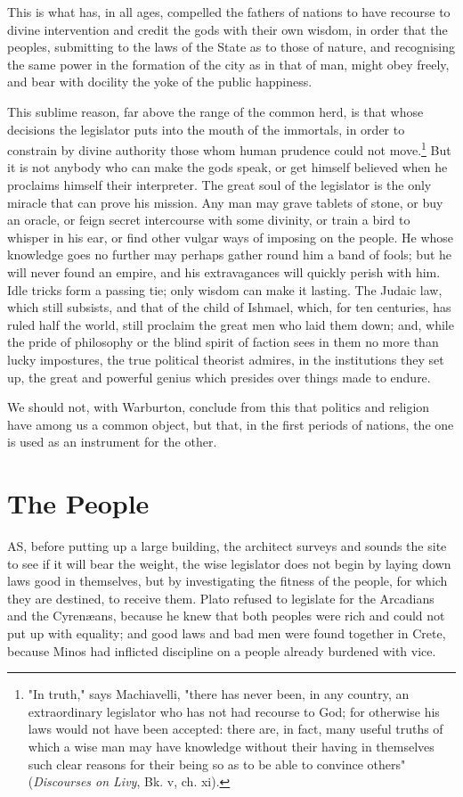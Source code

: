 \documentclass[12pt]{book}
\begin{document}
This is what has, in all ages, compelled the fathers of nations to have recourse to divine intervention and credit the gods with their own wisdom, in order that the peoples, submitting to the laws of the State as to those of nature, and recognising the same power in the formation of the city as in that of man, might obey freely, and bear with docility the yoke of the public happiness.

This sublime reason, far above the range of the common herd, is that whose decisions the legislator puts into the mouth of the immortals, in order to constrain by divine authority those whom human prudence could not move.\footnote{"In truth," says Machiavelli, "there has never been, in any country, an extraordinary legislator who has not had recourse to God; for otherwise his laws would not have been accepted: there are, in fact, many useful truths of which a wise man may have knowledge without their having in themselves such clear reasons for their being so as to be able to convince others" (\textit{Discourses on Livy}, Bk. v, ch. xi).} But it is not anybody who can make the gods speak, or get himself believed when he proclaims himself their interpreter. The great soul of the legislator is the only miracle that can prove his mission. Any man may grave tablets of stone, or buy an oracle, or feign secret intercourse with some divinity, or train a bird to whisper in his ear, or find other vulgar ways of imposing on the people. He whose knowledge goes no further may perhaps gather round him a band of fools; but he will never found an empire, and his extravagances will quickly perish with him. Idle tricks form a passing tie; only wisdom can make it lasting. The Judaic law, which still subsists, and that of the child of Ishmael, which, for ten centuries, has ruled half the world, still proclaim the great men who laid them down; and, while the pride of philosophy or the blind spirit of faction sees in them no more than lucky impostures, the true political theorist admires, in the institutions they set up, the great and powerful genius which presides over things made to endure.

We should not, with Warburton, conclude from this that politics and religion have among us a common object, but that, in the first periods of nations, the one is used as an instrument for the other.

\section{The People}
AS, before putting up a large building, the architect surveys and sounds the site to see if it will bear the weight, the wise legislator does not begin by laying down laws good in themselves, but by investigating the fitness of the people, for which they are destined, to receive them. Plato refused to legislate for the Arcadians and the Cyrenæans, because he knew that both peoples were rich and could not put up with equality; and good laws and bad men were found together in Crete, because Minos had inflicted discipline on a people already burdened with vice.
\end{document}
